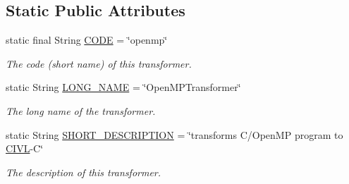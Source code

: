 \subsection*{Static Public Attributes}
\begin{DoxyCompactItemize}
\item 
\hypertarget{classedu_1_1udel_1_1cis_1_1vsl_1_1civl_1_1transform_1_1IF_1_1OpenMP2CIVLTransformer_ad7c8e0bd551e19442d417e7db0d6a5a2}{}static final String \hyperlink{classedu_1_1udel_1_1cis_1_1vsl_1_1civl_1_1transform_1_1IF_1_1OpenMP2CIVLTransformer_ad7c8e0bd551e19442d417e7db0d6a5a2}{C\+O\+D\+E} = \char`\"{}openmp\char`\"{}\label{classedu_1_1udel_1_1cis_1_1vsl_1_1civl_1_1transform_1_1IF_1_1OpenMP2CIVLTransformer_ad7c8e0bd551e19442d417e7db0d6a5a2}

\begin{DoxyCompactList}\small\item\em The code (short name) of this transformer. \end{DoxyCompactList}\item 
\hypertarget{classedu_1_1udel_1_1cis_1_1vsl_1_1civl_1_1transform_1_1IF_1_1OpenMP2CIVLTransformer_ada785b86ddb458decd3de28a533c44ac}{}static String \hyperlink{classedu_1_1udel_1_1cis_1_1vsl_1_1civl_1_1transform_1_1IF_1_1OpenMP2CIVLTransformer_ada785b86ddb458decd3de28a533c44ac}{L\+O\+N\+G\+\_\+\+N\+A\+M\+E} = \char`\"{}Open\+M\+P\+Transformer\char`\"{}\label{classedu_1_1udel_1_1cis_1_1vsl_1_1civl_1_1transform_1_1IF_1_1OpenMP2CIVLTransformer_ada785b86ddb458decd3de28a533c44ac}

\begin{DoxyCompactList}\small\item\em The long name of the transformer. \end{DoxyCompactList}\item 
\hypertarget{classedu_1_1udel_1_1cis_1_1vsl_1_1civl_1_1transform_1_1IF_1_1OpenMP2CIVLTransformer_a43431d2abc2e2d02ddb5fd32efa577c0}{}static String \hyperlink{classedu_1_1udel_1_1cis_1_1vsl_1_1civl_1_1transform_1_1IF_1_1OpenMP2CIVLTransformer_a43431d2abc2e2d02ddb5fd32efa577c0}{S\+H\+O\+R\+T\+\_\+\+D\+E\+S\+C\+R\+I\+P\+T\+I\+O\+N} = \char`\"{}transforms C/Open\+M\+P program to \hyperlink{classedu_1_1udel_1_1cis_1_1vsl_1_1civl_1_1CIVL}{C\+I\+V\+L}-\/C\char`\"{}\label{classedu_1_1udel_1_1cis_1_1vsl_1_1civl_1_1transform_1_1IF_1_1OpenMP2CIVLTransformer_a43431d2abc2e2d02ddb5fd32efa577c0}

\begin{DoxyCompactList}\small\item\em The description of this transformer. \end{DoxyCompactList}\end{DoxyCompactItemize}


